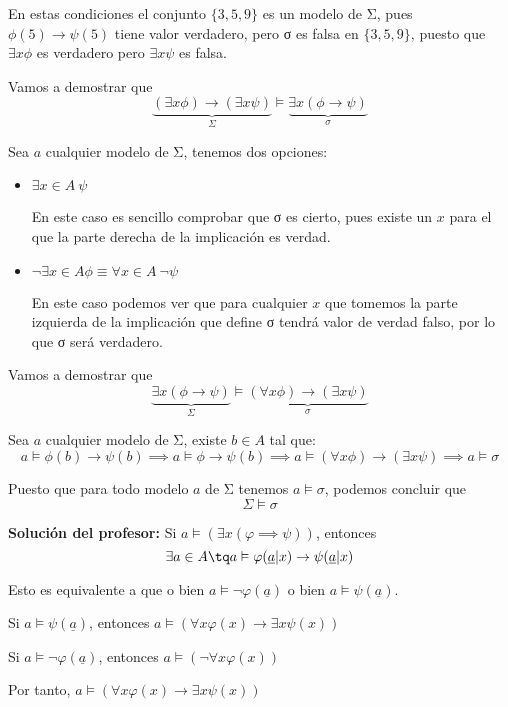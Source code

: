 \begin{problem}
En estas condiciones el conjunto $\{3,5,9\}$ es un modelo de Σ, pues $\phi(5)\to\psi(5)$ tiene valor verdadero, pero σ es falsa en $\{3,5,9\}$, puesto que $\exists x \phi$ es verdadero pero $\exists x \psi$ es falsa.

\newpage

\spart
Vamos a demostrar que
\[\underbrace{(\exists x  \phi )\to  (\exists x \psi)}_{Σ} \models  \underbrace{\exists x (\phi \to \psi)}_{σ}\]

Sea $a$ cualquier modelo de Σ, tenemos dos opciones:
\begin{itemize}
\item $\exists x \in A \ \psi$

En este caso es sencillo comprobar que σ es cierto, pues existe un $x$ para el que la parte derecha de la implicación es verdad.

\item $\neg \exists x \in A \phi \equiv \forall x \in A \ \neg \psi$

En este caso podemos ver que para cualquier $x$ que tomemos la parte izquierda de la implicación que define σ tendrá valor de verdad falso, por lo que σ será verdadero.

\end{itemize}


\spart

Vamos a demostrar que
\[\underbrace{\exists x (\phi \to \psi)}_{Σ} \models \underbrace{(\forall x  \phi ) \to  (\exists x \psi)}_{σ}\]

Sea $a$ cualquier modelo de Σ, existe $b \in A$ tal que:
\[a \models \phi(b) \to \psi(b) \implies a \models \phi \to \psi(b) \implies a\models  (\forall x \phi) \to (\exists x \psi) \implies a \models σ\]

Puesto que para todo modelo $a$ de Σ tenemos $a \models σ$, podemos concluir que
\[Σ \models σ\]

\textbf{Solución del profesor:}
Si $a\vDash (\exists x(\varphi\implies \psi))$, entonces $$\exists a\in A \tq a\vDash \varphi (\underline{a}|x)\to\psi(\underline{a}|x)$$

Esto es equivalente a que o bien $a\vDash \neg\varphi(\underline{a})$ o bien $a\vDash \psi(\underline{a})$.

Si $a\vDash \psi(\underline{a})$, entonces $a\vDash (\forall x \varphi(x)\to \exists x\psi(x))$

Si $a\vDash \neg \varphi(\underline{a})$, entonces $a\vDash (\neg \forall x\varphi(x))$

Por tanto, $a\vDash (\forall x\varphi(x)\to\exists x \psi(x))$


\end{problem}
